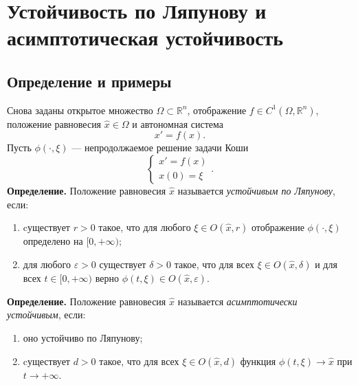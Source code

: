 \setcounter{equation}{0}
\section{Устойчивость по Ляпунову и асимптотическая устойчивость}
\subsection{Определение и примеры}
Снова заданы открытое множество $\Omega \subset \mathbb R^n$, отображение $f \in C^1(\Omega, \mathbb R^n)$, положение равновесия $\widehat{x} \in \Omega$ и автономная система
\begin{equation}
    x' = f(x).
\end{equation}
Пусть $\phi(\cdot, \xi)$ --- непродолжаемое решение задачи Коши 
\[
\begin{cases}
    x' = f(x)\\
    x(0) = \xi
\end{cases}.
\]
\textbf{Определение.} Положение равновесия $\widehat{x}$ называется \textit{устойчивым по Ляпунову}, если:
\begin{enumerate}
    \item cуществует $r > 0$ такое, что для любого $\xi \in O(\widehat{x}, r)$ отображение $\phi(\cdot, \xi)$ определено на $[0, +\infty)$;
    \item для любого $\varepsilon > 0$ существует $\delta > 0$ такое, что для всех $\xi \in O(\widehat{x}, \delta)$ и для всех $t \in [0, +\infty)$ верно $\phi(t, \xi) \in O(\widehat{x}, \varepsilon)$.
\end{enumerate}

\textbf{Определение.} Положение равновесия $\widehat{x}$ называется \textit{асимптотически устойчивым}, если:
\begin{enumerate}
    \item оно устойчиво по Ляпунову;
    \item cуществует $d > 0$ такое, что для всех $\xi \in O(\widehat{x}, d)$ функция $\phi(t, \xi) \to \widehat{x}$ при $t \to +\infty$.
\end{enumerate}

